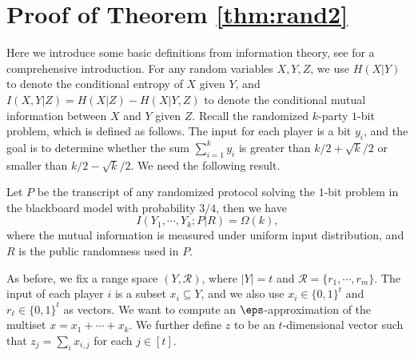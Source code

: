 \section{Proof of Theorem \ref{thm:rand2}} \label{app:proofrand2}
Here we introduce some basic definitions from information theory, see \cite{cover2006} for a comprehensive introduction. 
For any random variables $X,Y,Z$, we use $H(X|Y)$ to denote the conditional entropy of $X$ given $Y$, and $I(X,Y|Z)=H(X|Z)-H(X|Y,Z)$ to denote the conditional mutual information between $X$ and $Y$ given $Z$. 
Recall the randomized $k$-party $1$-bit problem, which is defined as follows. The input for
each player is a  bit $y_i$, and the goal is to determine whether the sum $\sum_{i=1}^k
y_i$ is greater than $k/2+\sqrt{k}/2$ or smaller than $k/2-\sqrt{k}/2$. We need the following result.
\begin{lemma}[\cite{WZ12}]\label{lemma:1bit}
Let $P$ be the transcript of any randomized protocol solving the $1$-bit problem in the
blackboard model with probability $3/4$, then we have
$$I(Y_1,\cdots,Y_k; P|R)=\Omega(k),$$
where the mutual information is measured under
uniform input distribution, and $R$ is the public randomness used in $P$.
\end{lemma}

As before, we fix a range space $(Y,\mathcal{R})$, where $|Y|=t$ and
$\mathcal{R}=\{r_1,\cdots, r_m\}$.  The input of each player $i$ is a subset $x_i\subseteq
Y$, and we also use $x_i\in\{0,1\}^t$ and $r_\ell\in\{0,1\}^t$ as vectors. We want to
compute an $\eps$-approximation of the multiset $x=x_1+ \cdots+ x_k$. We
further define $z$ to be an $t$-dimensional vector such that $z_j=\sum_i x_{i,j}$ for each
$j\in [t]$. 

